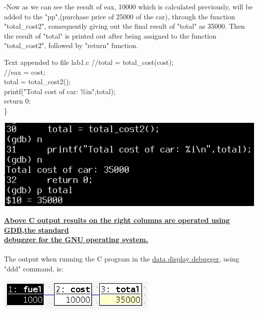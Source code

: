 \documentclass{article}
\begin{document}
-Now as we can see the result of eax, 10000 which is calculated previously, will be added to the "pp",(purchase price of 25000 of the car), through the function "total_cost2", consequently giving out the final result of "total" as 35000. Then the result of "total" is printed out after being assigned to the function "total_cost2", followed by "return" function.
\begin{multicols}{2}
\begin{GFT}{Text appended to file lab1.c}
\+//total = total\_cost(cost);\\
\+//eax = cost;\\
\+total = total\_cost2();\\
\+printf("Total cost of car: \%i\Backslash{}n",total);\\
\+return 0;\\
\+\}\\
\end{GFT}
\columnbreak
\raggedleft
\includegraphics[scale=0.4]{tcc.png}
\end{multicols}
\textbf{\underline{Above C output results on the right columns are operated using \href{https://en.wikipedia.org/wiki/GNU_Debugger}{GDB},the standard }} \\
\textbf{\underline{debugger for the GNU operating system.}} \\
\noindent{\color{red}\rule{\linewidth}{0.5mm}} \\

The output when running the C program in the \href{https://en.wikipedia.org/wiki/Data_Display_Debugger}{data display debugger}, using "ddd" command, is: 

\begin{center}
\includegraphics{out1.png}
\end{center}

\clearpage
\end{document}
